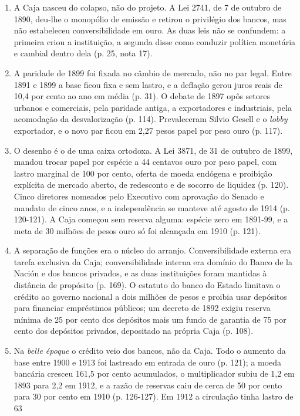 \begin{enumerate}[leftmargin=*,nosep]
\item A Caja nasceu do colapso, não do projeto. A Lei 2741, de 7 de outubro de
1890, deu-lhe o monopólio de emissão e retirou o privilégio dos bancos, mas não
estabeleceu conversibilidade em ouro. As duas leis não se confundem: a primeira
criou a instituição, a segunda disse como conduzir política monetária e cambial
dentro dela (p. 25, nota 17).
\item A paridade de 1899 foi fixada no câmbio de mercado, não no par legal.
Entre 1891 e 1899 a base ficou fixa e sem lastro, e a deflação gerou juros
reais de 10,4 por cento ao ano em média (p. 31). O debate de 1897 opôs setores
urbanos e comerciais, pela paridade antiga, a exportadores e industriais, pela
acomodação da desvalorização (p. 114). Prevaleceram Silvio Gesell e o
\emph{lobby} exportador, e o novo par ficou em 2,27 pesos papel por peso ouro
(p. 117).
\item O desenho é o de uma caixa ortodoxa. A Lei 3871, de 31 de outubro de
1899, mandou trocar papel por espécie a 44 centavos ouro por peso papel, com
lastro marginal de 100 por cento, oferta de moeda endógena e proibição
explícita de mercado aberto, de redesconto e de socorro de liquidez (p. 120).
Cinco diretores nomeados pelo Executivo com aprovação do Senado e mandato de
cinco anos, e a independência se manteve até agosto de 1914 (p. 120-121). A
Caja começou sem reserva alguma: espécie zero em 1891-99, e a meta de 30
milhões de pesos ouro só foi alcançada em 1910 (p. 121).
\item A separação de funções era o núcleo do arranjo. Conversibilidade externa
era tarefa exclusiva da Caja; conversibilidade interna era domínio do Banco de
la Nación e dos bancos privados, e as duas instituições foram mantidas à
distância de propósito (p. 169). O estatuto do banco do Estado limitava o
crédito ao governo nacional a dois milhões de pesos e proibia usar depósitos
para financiar empréstimos públicos; um decreto de 1892 exigiu reserva mínima
de 25 por cento dos depósitos mais um fundo de garantia de 75 por cento dos
depósitos privados, depositado na própria Caja (p. 108).
\item Na \emph{belle époque} o crédito veio dos bancos, não da Caja. Todo o
aumento da base entre 1900 e 1913 foi lastreado em entrada de ouro (p. 121); a
moeda bancária cresceu 161,5 por cento acumulados, o multiplicador subiu de 1,2
em 1893 para 2,2 em 1912, e a razão de reservas caiu de cerca de 50 por cento
para 30 por cento em 1910 (p. 126-127). Em 1912 a circulação tinha lastro de 63

\end{enumerate}
